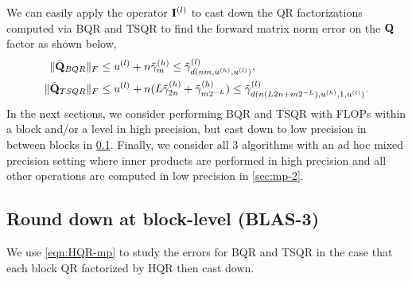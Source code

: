
We can easily apply the operator $\mathbf{I}^{(l)}$ to cast down the QR factorizations computed via BQR and TSQR to find the forward matrix norm error on the $\mathbf{Q}$ factor as shown below,
\begin{align*}
	\|\hat{\mathbf{Q}}_{BQR}\|_F&\leq u^{(l)}+n\tilde{\gamma}_m^{(h)} \leq \tilde{\gamma}_{d(nm,u^{(h)},u^{(l)})}^{(l)},\\
	\|\hat{\mathbf{Q}}_{TSQR}\|_F&\leq u^{(l)}+n(L\tilde{\gamma}_{2n}^{(h)}+\tilde{\gamma}_{m2^{-L}}^{(h)}) \leq \tilde{\gamma}_{d(n(L2n+m2^{-L}),u^{(h)},1,u^{(l)})}^{(l)}.
\end{align*}
In the next sections, we consider performing BQR and TSQR with FLOPs within a block and/or a level in high precision, but cast down to low precision in between blocks in \ref{sec:mp-3}.
Finally, we consider all 3 algorithms with an ad hoc mixed precision setting where inner products are performed in high precision and all other operations are computed in low precision in \ref{sec:mp-2}.
\subsection{Round down at block-level (BLAS-3)}\label{sec:mp-3}
We use \cref{eqn:HQR-mp} to study the errors for BQR and TSQR in the case that each block QR factorized by HQR then cast down.
